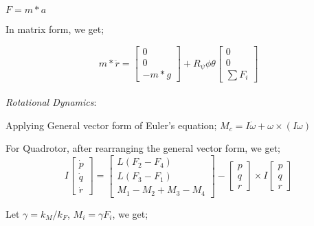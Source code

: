 $F = m * a$ 

In matrix form, we get;

\[
m*\ddot{r} = \begin{bmatrix}
    0 \\
    0 \\
    -m*g
\end{bmatrix} + 
R_\psi\phi\theta \begin{bmatrix}
    0 \\
    0 \\
    \sum F_i
\end{bmatrix}
\]
\\

\textit{Rotational Dynamics}:




Applying General vector form of Euler's equation;
$M_c = I\dot{\omega} + \omega \times (I\omega)$

For Quadrotor, after rearranging the general vector form, we get;
\[
I\begin{bmatrix}
    \dot{p} \\
    \dot{q} \\
    \dot{r}
\end{bmatrix} = 
\begin{bmatrix}
    L(F_2 - F_4) \\
    L(F_3 - F_1) \\
    M_1 - M_2 + M_3 - M_4
\end{bmatrix} - 
\begin{bmatrix}
    p \\
    q \\
    r
\end{bmatrix}
\times I\begin{bmatrix}
    p \\
    q \\
    r
\end{bmatrix}
\]

Let $\gamma = k_M/k_F$, $M_i = \gamma F_i$, we get;

